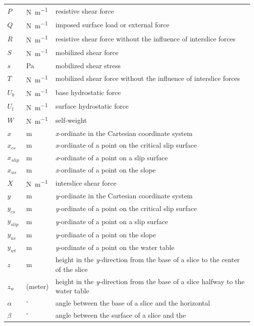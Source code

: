 \documentclass[12pt]{article}
\begin{document}
\begin{longtable*}{  l  l  p{8.5cm}  }
$P$ & \si{\newton\per\meter} & resistive shear force
\\
$Q$ & \si{\newton\per\meter} & imposed surface load or external force
\\
$R$ & \si{\newton\per\meter} & resistive shear force without the influence of 
interslice 
forces
\\
$S$ & \si{\newton\per\meter} & mobilized shear force
\\
$s$ &\si{\pascal} & mobilized shear stress
\\
$T$ & \si{\newton\per\meter} & mobilized shear force without the influence of 
interslice 
forces
\\
${U_{b}}$ & \si{\newton\per\meter} & base hydrostatic force
\\
${U_{t}}$ & \si{\newton\per\meter} & surface hydrostatic force
\\
$W$ & \si{\newton\per\meter} & self-weight
\\
$x$ & \si{\meter}& \textit{x}-ordinate in the Cartesian coordinate system
\\
$x_{cs}$ & \si{\meter} & \textit{x}-ordinate of a point on the critical slip 
surface
\\
${x_{slip}}$ &  \si{\meter}& \textit{x}-ordinate of a point on a slip surface
\\
${x_{us}}$ &  \si{\meter}& \textit{x}-ordinate of a point on the slope
\\
$X$ & \si{\newton\per\meter} & interslice shear force
\\
$y$ &  \si{\meter}& \textit{y}-ordinate in the Cartesian coordinate system
\\
$y_{cs}$ & \si{\meter} & \textit{y}-ordinate of a point on the critical slip 
surface
\\
${y_{slip}}$ & \si{\meter}& \textit{y}-ordinate of a point on a slip surface
\\
${y_{us}}$ &  \si{\meter}& \textit{y}-ordinate of a point on the slope 
\\
${y_{wt}}$ &  \si{\meter}& \textit{y}-ordinate of a point on the water table
\\
$z$ & \si{\meter}& height in the \textit{y}-direction from the base of a slice 
to the center of the slice
\\
$z_w$ & (\si{meter})& height in the \textit{y}-direction from the base of a 
slice halfway to the water table
\\
$\alpha{}$ & ${}^{\circ}$ & angle between the base of a slice and the horizontal
\\
$\beta{}$ &${}^{\circ}$ & angle between the surface of a slice and the 

\end{longtable*}
\end{document}
